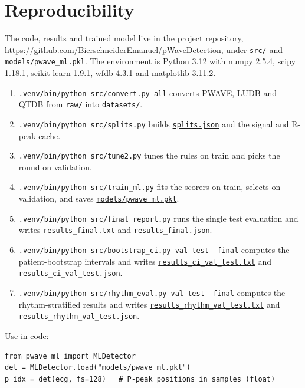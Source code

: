 \documentclass[11pt,a4paper]{article}
\newcommand{\code}[1]{\texttt{#1}}
\newcommand{\repourl}{https://github.com/BierschneiderEmanuel/pWaveDetection}
\newcommand{\repofile}[2]{\href{\repourl/blob/main/#2}{\code{#1}}}
\newcommand{\repodir}[2]{\href{\repourl/tree/main/#2}{\code{#1}}}
\begin{document}
\section*{Reproducibility}
\begingroup\raggedright

The code, results and trained model live in the project repository, \url{https://github.com/BierschneiderEmanuel/pWaveDetection}, under \repodir{src/}{src} and \repofile{models/pwave\_ml.pkl}{models/pwave_ml.pkl}. The environment is Python 3.12 with numpy 2.5.4, scipy 1.18.1, scikit-learn 1.9.1, wfdb 4.3.1 and matplotlib 3.11.2.
\begin{enumerate}
\item \code{.venv/bin/python src/convert.py all} converts PWAVE, LUDB and QTDB from \code{raw/} into \code{datasets/}.
\item \code{.venv/bin/python src/splits.py} builds \repofile{splits.json}{splits.json} and the signal and R-peak cache.
\item \code{.venv/bin/python src/tune2.py} tunes the rules on train and picks the round on validation.
\item \code{.venv/bin/python src/train\_ml.py} fits the scorers on train, selects on validation, and saves \repofile{models/pwave\_ml.pkl}{models/pwave_ml.pkl}.
\item \code{.venv/bin/python src/final\_report.py} runs the single test evaluation and writes \repofile{results\_final.txt}{results_final.txt} and \repofile{results\_final.json}{results_final.json}.
\item \code{.venv/bin/python src/bootstrap\_ci.py val test --final} computes the patient-bootstrap intervals and writes \repofile{results\_ci\_val\_test.txt}{results_ci_val_test.txt} and \repofile{results\_ci\_val\_test.json}{results_ci_val_test.json}.
\item \code{.venv/bin/python src/rhythm\_eval.py val test --final} computes the rhythm-stratified results and writes \repofile{results\_rhythm\_val\_test.txt}{results_rhythm_val_test.txt} and \repofile{results\_rhythm\_val\_test.json}{results_rhythm_val_test.json}.
\end{enumerate}
\endgroup
\noindent\begin{minipage}{\linewidth}
Use in code:
\begin{verbatim}
from pwave_ml import MLDetector
det = MLDetector.load("models/pwave_ml.pkl")
p_idx = det(ecg, fs=128)   # P-peak positions in samples (float)
\end{verbatim}
\end{minipage}
\end{document}
